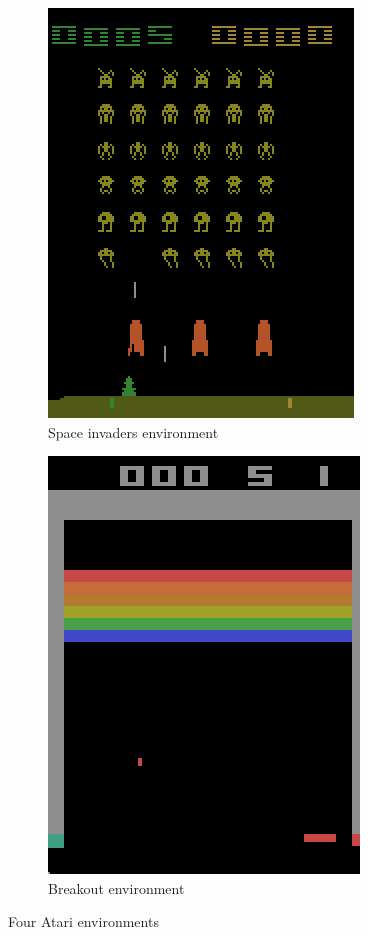 \documentclass[11pt]{article}
\begin{document}
\begin{figure}[H]
    \begin{subfigure}[b]{.5\textwidth}
        \centering
        \includegraphics[scale=0.75]{include/space.png}
        \caption{Space invaders environment}
    \end{subfigure}
    \begin{subfigure}[b]{.5\textwidth}
        \centering
        \includegraphics[scale=0.75]{include/breakout.png}
        \caption{Breakout environment}
    \end{subfigure}
    \caption{Four Atari environments}
    \label{fig:Atari_env}
\end{figure}
\end{document}
